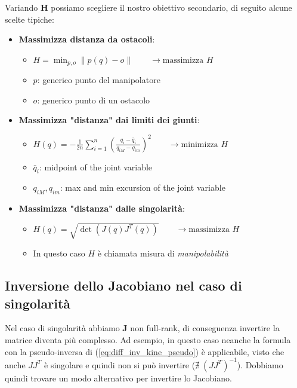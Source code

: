 Variando $\bm{H}$ possiamo scegliere il nostro obiettivo secondario, di seguito alcune scelte tipiche:
\begin{itemize}
	\item \textbf{Massimizza distanza da ostacoli}: 
	\begin{itemize}
		\item $\displaystyle H = \min_{p,o} \| p(q) - o \| \qquad \rightarrow \text{massimizza } H$
		\item $p$: generico punto del manipolatore
		\item $o$: generico punto di un ostacolo
	\end{itemize}
	
	\item \textbf{Massimizza "distanza" dai limiti dei giunti}: 
	\begin{itemize}
		\item $\displaystyle H(q)=-{\frac{1}{2n}}\sum_{i=1}^{n}\left({\frac{q_{i}-{\bar{q}}_{i}}{q_{i M}-q_{i m}}}\right)^{2} \qquad \rightarrow \text{minimizza } H$ 
		\item ${\bar{q}}_{i}$: midpoint of the joint variable
		\item $q_{iM},q_{im}$: max and min excursion of the joint variable
	\end{itemize}
	
	\item \textbf{Massimizza "distanza" dalle singolarità}: 
	\begin{itemize}
		\item $H(q)=\sqrt{\operatorname*{det}(J(q)J^{T}(q))} \qquad \rightarrow \text{massimizza } H$ 
		\item In questo caso $H$ è chiamata misura di \textit{manipolabilità}
	\end{itemize}
\end{itemize}






\subsection{Inversione dello Jacobiano nel caso di singolarità}
Nel caso di singolarità abbiamo $\bm{J}$ non full-rank, di conseguenza invertire la matrice diventa più complesso. Ad esempio, in questo caso neanche la formula con la pseudo-inversa di (\ref{eq:diff_inv_kine_pseudo}) è applicabile, visto che anche $JJ^T$ è singolare e quindi non si può invertire ($\nexists \ (JJ^T)^{-1}$). Dobbiamo quindi trovare un modo alternativo per invertire lo Jacobiano.

